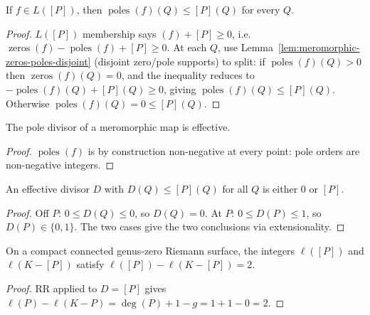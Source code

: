 \begin{lemma}
\label{lem:mem-L-point-pole-pointwise-bound}
If \(f\in L([P])\), then \(\operatorname{poles}(f)(Q)\leq[P](Q)\) for every \(Q\).
\leanok
\end{lemma}
\begin{proof}
\leanok
\(L([P])\) membership says \((f)+[P]\geq 0\), i.e.\
\(\operatorname{zeros}(f)-\operatorname{poles}(f)+[P]\geq 0\). At each \(Q\), use
Lemma~\ref{lem:meromorphic-zeros-poles-disjoint} (disjoint zero/pole
supports) to split: if \(\operatorname{poles}(f)(Q)>0\) then \(\operatorname{zeros}(f)(Q)=0\),
and the inequality reduces to \(-\operatorname{poles}(f)(Q)+[P](Q)\geq 0\), giving
\(\operatorname{poles}(f)(Q)\leq[P](Q)\). Otherwise \(\operatorname{poles}(f)(Q)=0\leq[P](Q)\).
\end{proof}

\begin{lemma}
\label{lem:meromorphic-poles-effective}
The pole divisor of a meromorphic map is effective.

\end{lemma}
\begin{proof}
\(\operatorname{poles}(f)\) is by construction non-negative at every point: pole
orders are non-negative integers.
\end{proof}

\begin{lemma}
\label{lem:divisor-effective-le-point-iff}
An effective divisor \(D\) with \(D(Q)\leq[P](Q)\) for all \(Q\) is
either \(0\) or \([P]\).
\leanok
\end{lemma}
\begin{proof}
\leanok
Off \(P\): \(0\leq D(Q)\leq 0\), so \(D(Q)=0\). At \(P\):
\(0\leq D(P)\leq 1\), so \(D(P)\in\{0,1\}\). The two cases give the
two conclusions via \code{Finsupp} extensionality.
\end{proof}

\begin{lemma}
\label{lem:genus-zero-rr-identity-applied}
On a compact connected genus-zero Riemann surface, the integers
\(\ell([P])\) and \(\ell(K-[P])\) satisfy
\(\ell([P])-\ell(K-[P])=2\).
\leanok
\end{lemma}
\begin{proof}
\leanok
RR applied to \(D=[P]\) gives
\(\ell(P)-\ell(K-P)=\deg(P)+1-g=1+1-0=2\).
\end{proof}

